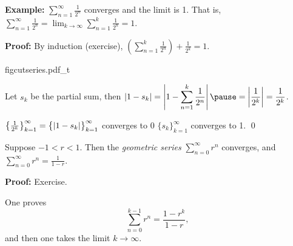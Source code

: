 \documentclass[10pt,aspectratio=169]{beamer}
\begin{document}
\begin{frame}

\textbf{Example:}
$\displaystyle \sum_{n=1}^\infty \frac{1}{2^n}$
converges and the limit is 1.  That is,
$\displaystyle
\sum_{n=1}^\infty \frac{1}{2^n} = 
\lim_{k\to\infty} \sum_{n=1}^k \frac{1}{2^n} = 
1$.

\pause
\medskip

\textbf{Proof:} By induction (exercise), \quad
$\displaystyle
\left( \sum_{n=1}^k \frac{1}{2^n} \right)
+ \frac{1}{2^k}
= 1$.

\pause
\medskip

\hspace*{\fill}
{figcutseries.pdf_t}
\hspace*{\fill}

\pause
\medskip

Let $s_k$ be the partial sum, then
\quad
$\displaystyle
\abs{
1 - s_k 
}
=
\abs{
1 - 
\sum_{n=1}^k \frac{1}{2^n}
}
\pause
=
\abs{\frac{1}{2^k}} = 
\frac{1}{2^k}$.

\pause
\medskip

$\bigl\{ \frac{1}{2^k} \bigr\}_{k=1}^\infty = \bigl\{ \left\lvert {1-s_k} \right\rvert
\bigr\}_{k=1}^\infty$
converges to $0$
\pause
\wthus $\{ s_k \}_{k=1}^\infty$ converges to 1.
\qed

\end{frame}

\begin{frame}

\begin{proposition}
Suppose
$-1 < r < 1$.  Then the \emph{geometric series}
$\displaystyle \sum_{n=0}^\infty r^n$ converges, and
\quad
$\displaystyle
\sum_{n=0}^\infty r^n = \frac{1}{1-r}
$.
\end{proposition}

\pause

\textbf{Proof:} Exercise.

\pause
\medskip

One proves
\begin{equation*}
\sum_{n=0}^{k-1} r^n = \frac{1-r^k}{1-r} ,
\end{equation*}
\pause
and then one takes the limit $k \to \infty$.

\end{frame}
\end{document}
